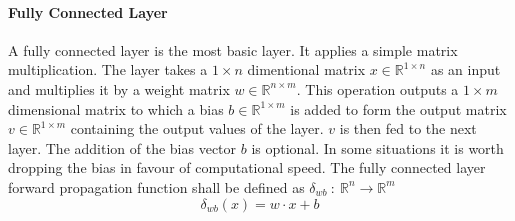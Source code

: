 \documentclass[12pt]{article}
\begin{document}
\paragraph{Fully Connected Layer}
A fully connected layer is the most basic layer. It applies a simple matrix multiplication. The layer takes a \(1 \times n\) dimentional matrix \(x \in \mathbb{R}^{1\times n}\) as an input and multiplies it by a weight matrix \(w \in\mathbb{R}^{n\times m}\). This operation outputs a \(1\times m\) dimensional matrix to which a bias \(b \in \mathbb{R}^{1 \times m}\) is added to form the output matrix \(v \in \mathbb{R}^{1 \times m}\) containing the output values of the layer. \(v\) is then fed to the next layer. The addition of the bias vector \(b\) is optional. In some situations it is worth dropping the bias in favour of computational speed. The fully connected layer forward propagation function shall be defined as \(\delta_{wb}~:~\mathbb{R}^n\to\mathbb{R}^m\)
\begin{equation} \label{eq:NN:fully_connected_layer_forward}
\delta_{wb}(x) = w \cdot x + b
\end{equation}
\end{document}
